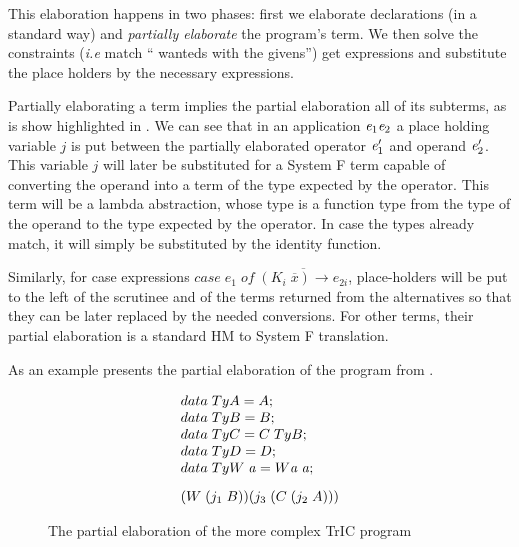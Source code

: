 This elaboration happens in two phases: first we elaborate declarations (in a standard way) and \textit{partially elaborate} the program's term. We then solve the constraints (\textit{i.e} match `` wanteds with the givens'') get expressions and substitute the place holders by the necessary expressions.

Partially elaborating a term implies the partial elaboration all of its subterms, as is show highlighted in . We can see that in an application $\mathit{e}_1 \mathit{e}_2$ a place holding variable $j$ is put between the partially elaborated operator $\mathit{e}_1'$ and operand $\mathit{e}_2'$. This variable $j$ will later be substituted for a System F term capable of converting the operand into a term of the type expected by the operator. This term will be a lambda abstraction, whose type is a function type from the type of the operand to the type expected by the operator. In case the types already match, it will simply be substituted by the identity function.

Similarly, for case expressions $case\;e_1\;of\;\overline{(K_i\;\overline{x})\rightarrow e_{2i}}$, place-holders will be put to the left of the scrutinee and of the terms returned from the alternatives so that they can be later replaced by the needed conversions. For other terms, their partial elaboration is a standard HM to System F translation.

As an example  presents the partial elaboration of the program from .

\begin{figure}
     \[
\begin{array}{@{\hspace{0mm}}l@{\hspace{0mm}}}
  data\;TyA=A;\\
  data\;TyB=B;\\
  data\;TyC=C \; TyB;\\
  data\;TyD=D;\\
  data\;TyW\;\tyVar=W \tyVar \; \tyVar;\\[3mm]
  (W\;(j_1\;B)) (j_3 \; (C\;(j_2\;A)))

\end{array}
\]
\caption{The partial elaboration of the more complex TrIC program}
\label{partialElab}
\end{figure}
